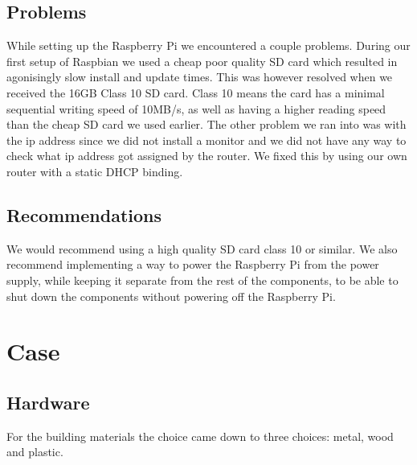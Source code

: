 \documentclass[a4paper,oneside]{book}
\begin{document}
\subsection{Problems}
While setting up the Raspberry Pi we encountered a couple problems. During our
first setup of Raspbian we used a cheap poor quality SD card which resulted in
agonisingly slow install and update times. This was however resolved when we
received the 16GB Class 10 SD card. Class 10 means the card has a minimal
sequential writing speed of 10MB/s, as well as having a higher reading speed
than the cheap SD card we used earlier. The other problem we ran into was with
the ip address since we did not install a monitor and we did not have any way
to check what ip address got assigned by the router. We fixed this by using our
own router with a static DHCP binding.

\subsection{Recommendations}
We would recommend using a high quality SD card class 10 or similar. We also
recommend implementing a way to power the Raspberry Pi from the power supply,
while keeping it separate from the rest of the components, to be able to shut
down the components without powering off the Raspberry Pi.

\section{Case}
\label{sec:case}
\subsection{Hardware}
For the building materials the choice came down to three choices: metal, wood
and plastic. 
\end{document}
